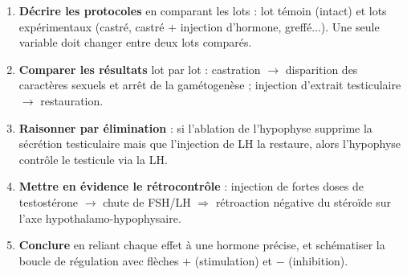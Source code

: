 \documentclass[11pt]{article}
\begin{document}
\begin{methode}
\begin{enumerate}
\item \textbf{Décrire les protocoles} en comparant les lots : lot témoin (intact) et lots expérimentaux (castré, castré + injection d'hormone, greffé...). Une seule variable doit changer entre deux lots comparés.
\item \textbf{Comparer les résultats} lot par lot : castration $\rightarrow$ disparition des caractères sexuels et arrêt de la gamétogenèse ; injection d'extrait testiculaire $\rightarrow$ restauration.
\item \textbf{Raisonner par élimination} : si l'ablation de l'hypophyse supprime la sécrétion testiculaire mais que l'injection de LH la restaure, alors l'hypophyse contrôle le testicule via la LH.
\item \textbf{Mettre en évidence le rétrocontrôle} : injection de fortes doses de testostérone $\rightarrow$ chute de FSH/LH $\Rightarrow$ rétroaction négative du stéroïde sur l'axe hypothalamo-hypophysaire.
\item \textbf{Conclure} en reliant chaque effet à une hormone précise, et schématiser la boucle de régulation avec flèches $+$ (stimulation) et $-$ (inhibition).
\end{enumerate}
\end{methode}
\end{document}
